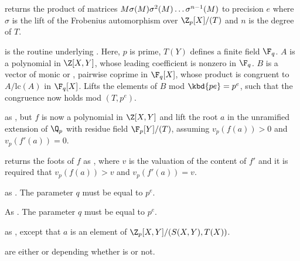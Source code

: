 


returns the product of matrices $M\*\sigma(M)\*\sigma^2(M)\ldots\sigma^{n-1}(M)$
to precision $e$ where $\sigma$ is the lift of the Frobenius automorphism
over $\Z_p[X]/(T)$ and $n$ is the degree of $T$.


 is the
routine underlying . Here, $p$ is prime, $T(Y)$ defines a
finite field $\F_q$. $A$ is a polynomial in $\Z[X,Y]$, whose leading
coefficient is nonzero in $\F_q$. $B$ is a vector of monic or ,
pairwise coprime in $\F_q[X]$, whose product is congruent to $A/\text{lc}(A)$
in $\F_q[X]$. Lifts the elements of $B$ mod $\kbd{pe} = p^e$, such that the
congruence now holds mod $(T,p^e)$.

 as
, but $f$ is now a polynomial in $\Z[X,Y]$ and lift the
root $a$ in the unramified extension of $\Q_p$ with residue field $\F_p[Y]/(T)$,
assuming $v_p(f(a))>0$ and $v_p(f'(a))=0$.

returns the foots of $f$ as , where $v$ is the valuation
of the content of $f'$ and it is required that $v_p(f(a))>v$ and
$v_p(f'(a))=v$.



as . The parameter $q$ must be equal to $p^e$.

As . The parameter $q$ must be equal to $p^e$.

as , except that $a$ is an element of
$\Z_p[X,Y]/(S(X,Y),T(X))$.

 are either  or  depending whether  is  or not.


